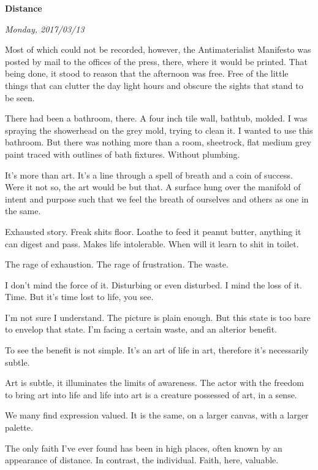 

\centerline{\bf Distance}
\centerline{\it Monday, 2017/03/13}


\vfill
\break

﻿Most of which could not be recorded, however, the Antimaterialist
Manifesto was posted by mail to the offices of the press, there, where
it would be printed.  That being done, it stood to reason that the
afternoon was free.  Free of the little things that can clutter the
day light hours and obscure the sights that stand to be seen.

\vfill
\break

﻿There had been a bathroom, there.  A four inch tile wall, bathtub,
molded.  I was spraying the showerhead on the grey mold, trying to
clean it.  I wanted to use this bathroom.  But there was nothing more
than a room, sheetrock, flat medium grey paint traced with outlines of
bath fixtures.  Without plumbing.

\vfill
\break

﻿It's more than art.  It's a line through a spell of breath and a coin
of success.  Were it not so, the art would be but that.  A surface
hung over the manifold of intent and purpose such that we feel the
breath of ourselves and others as one in the same.

\vfill
\break

﻿Exhausted story.  Freak shits floor.  Loathe to feed it peanut butter,
anything it can digest and pass.  Makes life intolerable.  When will
it learn to shit in toilet.

The rage of exhaustion.  The rage of frustration.  The waste.

\vfill
\break

﻿I don't mind the force of it.  Disturbing or even disturbed.  I mind
the loss of it.  Time.  But it's time lost to life, you see.

I'm not sure I understand.  The picture is plain enough.  But this
state is too bare to envelop that state.  I'm facing a certain waste,
and an alterior benefit.

To see the benefit is not simple.  It's an art of life in art,
therefore it's necessarily subtle.

Art is subtle, it illuminates the limits of awareness.  The actor with
the freedom to bring art into life and life into art is a creature
possessed of art, in a sense.

We many find expression valued.  It is the same, on a larger canvas,
with a larger palette.

\vfill
\break

﻿The only faith I've ever found has been in high places, often known by
an appearance of distance.  In contrast, the individual.  Faith, here,
valuable.

\vfill
\bye
